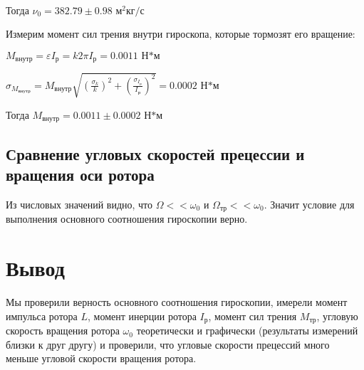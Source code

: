 \documentclass[a4paper]{article}
\begin{document}
\\

\item Тогда $\nu_0 = 382.79 \pm{0.98} \text{ м$^2$кг/с}$

\item Измерим момент сил трения внутри гироскопа, которые тормозят его вращение:

\item $M_\text{внутр} = \varepsilon I_\text{р} = k2\pi I_\text{р} = 0.0011 \text{ Н*м}$

\item $\sigma_{M_\text{внутр}} = M_\text{внутр} \sqrt{(\frac{\sigma_k}{k})^2 + (\frac{\sigma_{I_\text{р}}}{I_\text{р}})^2} = 0.0002 \text{ Н*м}$

\item Тогда $M_\text{внутр} = 0.0011 \pm{0.0002} \text{ Н*м}$

\subsection{Сравнение угловых скоростей прецессии и вращения оси ротора}

Из числовых значений видно, что $\Omega << \omega_0$ и $\Omega_\text{тр} << \omega_0$. Значит условие для выполнения основного соотношения гироскопии верно.

\section{Вывод}

Мы проверили верность основного соотношения гироскопии, имерели момент импульса ротора $L$, момент инерции ротора $I_\text{р}$, момент сил трения $M_\text{тр}$, угловую скорость вращения ротора $\omega_0$ теоретически и графически (результаты измерений близки к друг другу) и проверили, что угловые скорости прецессий много меньше угловой скорости вращения ротора.
\end{document}
